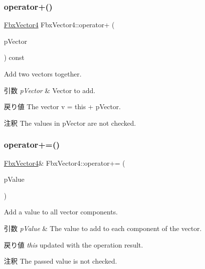 \subsubsection{\texorpdfstring{operator+()}{operator+()}\hspace{0.1cm}{\footnotesize\ttfamily [2/2]}}
{\footnotesize\ttfamily \hyperlink{class_fbx_vector4}{Fbx\+Vector4} Fbx\+Vector4\+::operator+ (\begin{DoxyParamCaption}\item[{const \hyperlink{class_fbx_vector4}{Fbx\+Vector4} \&}]{p\+Vector }\end{DoxyParamCaption}) const}

Add two vectors together. 
\begin{DoxyParams}{引数}
{\em p\+Vector} & Vector to add. \\
\hline
\end{DoxyParams}
\begin{DoxyReturn}{戻り値}
The vector v\textquotesingle{} = this + p\+Vector. 
\end{DoxyReturn}
\begin{DoxyRemark}{注釈}
The values in p\+Vector are not checked. 
\end{DoxyRemark}
\mbox{\label{class_fbx_vector4_a7585be2323b66c795e0eab14498ee78b}} 
\subsubsection{\texorpdfstring{operator+=()}{operator+=()}\hspace{0.1cm}{\footnotesize\ttfamily [1/2]}}
{\footnotesize\ttfamily \hyperlink{class_fbx_vector4}{Fbx\+Vector4}\& Fbx\+Vector4\+::operator+= (\begin{DoxyParamCaption}\item[{double}]{p\+Value }\end{DoxyParamCaption})}

Add a value to all vector components. 
\begin{DoxyParams}{引数}
{\em p\+Value} & The value to add to each component of the vector. \\
\hline
\end{DoxyParams}
\begin{DoxyReturn}{戻り値}
{\itshape this} updated with the operation result. 
\end{DoxyReturn}
\begin{DoxyRemark}{注釈}
The passed value is not checked. 
\end{DoxyRemark}
\mbox{\label{class_fbx_vector4_a0db8c14b539c1a47b3a7a996569e1c89}} 
